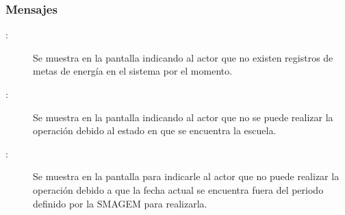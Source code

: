 \subsubsection{Mensajes}

    \begin{description}
	\item [:] Se muestra en la pantalla  indicando al actor que no existen registros de metas de energía en el sistema por el momento.
	
	\item [:] Se muestra en la pantalla  indicando al actor que no se puede realizar la operación debido al estado en que se encuentra la escuela.
	
	\item [:] Se muestra en la pantalla  para indicarle al actor que no puede realizar la operación debido a que la fecha actual se encuentra fuera del periodo definido por la SMAGEM para realizarla.
    \end{description}
